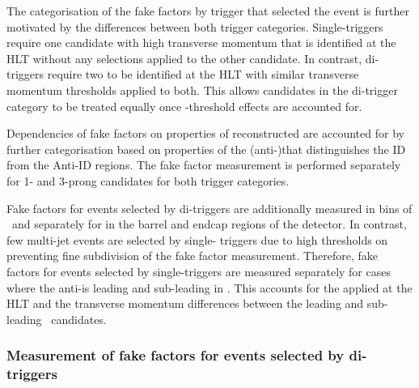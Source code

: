 The categorisation of the fake factors by trigger that selected the
event is further motivated by the differences between both trigger
categories. Single-\tauhadvis triggers require one \tauhadvis
candidate with high transverse momentum that is identified at the HLT
without any selections applied to the other candidate. In contrast,
di-\tauhadvis triggers require two \tauhadvis to be identified at the
HLT with similar transverse momentum thresholds applied to both. This
allows \tauhadvis candidates in the di-\tauhadvis trigger category to
be treated equally once \pT-threshold effects are accounted
for. %

Dependencies of fake factors on properties of reconstructed \tauhadvis
are accounted for by further categorisation based on properties of the
(anti-)\tauhadvis that distinguishes the ID from the Anti-ID
regions. The fake factor measurement is performed separately for 1-
and 3-prong \tauhadvis candidates for both trigger categories.

Fake factors for events selected by di-\tauhadvis triggers are
additionally measured in bins of \tauhadvis~\pT and separately for
\tauhadvis in the barrel and endcap regions of the detector. In
contrast, few multi-jet events are selected by single-\tauhadvis
triggers due to high \pT thresholds on \tauhadvis preventing fine
subdivision of the fake factor measurement. Therefore, fake factors
for events selected by single-\tauhadvis triggers are measured
separately for cases where the anti-\tauhadvis is leading and
sub-leading in \pT. This accounts for the \tauid applied at the HLT
and the transverse momentum differences between the leading and
sub-leading \tauhadvis~candidates.


\subsubsection{Measurement of fake factors for events selected by
  di-\tauhadvis triggers}

